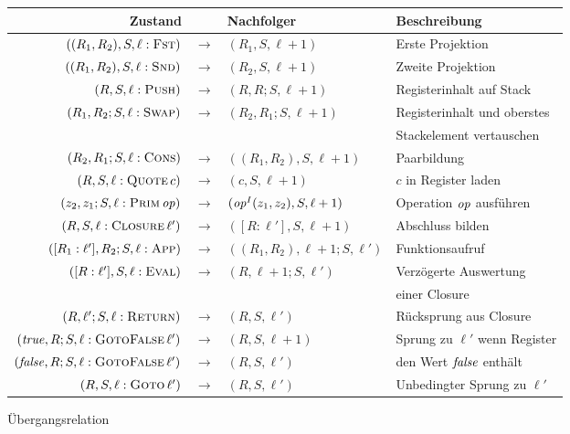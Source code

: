 \documentclass[12pt,fleqn,a4paper]{article}
\begin{document}
\begin{figure}
  {\footnotesize
  \begin{center}
    \begin{tabular}{|rcl|l|}
      \hline
      Zustand \hfill \quad && Nachfolger & Beschreibung \\
      \hline
      $((R_1,R_2),S,\ell:\textsc{Fst})$ & $\to$ & $(R_1,S,\ell+1)$ & Erste Projektion \\
      $((R_1,R_2),S,\ell:\textsc{Snd})$ & $\to$ & $(R_2,S,\ell+1)$ & Zweite Projektion \\
      \hline
      $(R,S,\ell:\textsc{Push})$ & $\to$ & $(R,R;S,\ell+1)$ & Registerinhalt auf Stack \\
      $(R_1,R_2;S,\ell:\textsc{Swap})$ & $\to$ & $(R_2,R_1;S,\ell+1)$ & Registerinhalt und oberstes \\
      &&& Stackelement vertauschen \\
      $(R_2,R_1;S,\ell:\textsc{Cons})$ & $\to$ & $((R_1,R_2),S,\ell+1)$ & Paarbildung \\
      \hline
      $(R,S,\ell:\textsc{Quote}\,c)$ & $\to$ & $(c,S,\ell+1)$ & $c$ in Register laden \\
      $(z_2,z_1;S,\ell:\textsc{Prim}\,{\text{\it op\/}})$ & $\to$ & $({\text{\it op\/}}^I(z_1,z_2),S,\ell+1)$ & Operation ${\text{\it op\/}}$ ausf\"uhren \\
      $(R,S,\ell:\textsc{Closure}\,\ell')$ & $\to$ & $([R:\ell'],S,\ell+1)$ & Abschluss bilden \\
      \hline
      $([R_1:\ell'],R_2;S,\ell:\textsc{App})$ & $\to$ & $((R_1,R_2),\ell+1;S,\ell')$ & Funktionsaufruf \\
      $([R:\ell'],S,\ell:\textsc{Eval})$ & $\to$ & $(R,\ell+1;S,\ell')$ & Verz\"ogerte Auswertung \\
      &&& einer Closure \\
      $(R,\ell';S,\ell:\textsc{Return})$ & $\to$ & $(R,S,\ell')$ & R\"ucksprung aus Closure \\
      $({\text{\it true\/}},R;S,\ell:\textsc{GotoFalse}\,\ell')$ & $\to$ & $(R,S,\ell+1)$ & Sprung zu $\ell'$ wenn Register \\
      $({\text{\it false\/}},R;S,\ell:\textsc{GotoFalse}\,\ell')$ & $\to$ & $(R,S,\ell')$ & den Wert ${\text{\it false\/}}$ enth\"alt \\
      $(R,S,\ell:\textsc{Goto}\,\ell')$ & $\to$ & $(R,S,\ell')$ & Unbedingter Sprung zu $\ell'$ \\
      \hline
    \end{tabular}
  \end{center}}
  \caption{\"Ubergangsrelation}
  \label{table:CAM_Transitions}
\end{figure}
\end{document}
